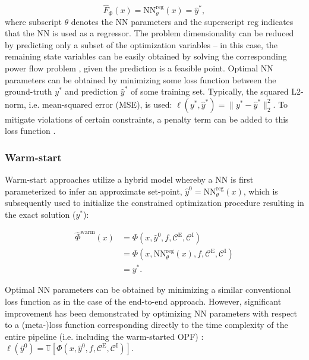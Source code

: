 \documentclass[journal]{IEEEtran}
\begin{document}
\begin{equation}
    \hat{F}_{\Phi}(x) = \mathrm{NN}_{\theta}^{\mathrm{reg}}(x) = \hat{y}^{*},
\end{equation}
where subscript $\theta$ denotes the NN parameters and the superscript $\mathrm{reg}$ indicates that the NN is used as a regressor. The problem dimensionality can be reduced by predicting only a subset of the optimization variables -- in this case, the remaining state variables can be easily obtained by solving the corresponding power flow problem \cite{Zamzam2019}, given the prediction is a feasible point. Optimal NN parameters can be obtained by minimizing some loss function between the ground-truth $y^*$ and prediction $\hat{y}^{*}$ of some training set. Typically, the squared L2-norm, i.e. mean-squared error (MSE), is used: $\ell(y^*,\hat{y}^*) = \| y^*-\hat{y}^* \|_2^2$. To mitigate violations of certain constraints, a penalty term can be added to this loss function \cite{Fioretto2019}.

\subsubsection{Warm-start}
Warm-start approaches utilize a hybrid model whereby a NN is first parameterized to infer an approximate set-point, $\hat{y}^{0} = \mathrm{NN}_{\theta}^{\mathrm{reg}}(x)$, which is subsequently used to initialize the constrained optimization procedure resulting in the exact solution ($y^{*}$): 

\begin{align}
    \hat{\Phi}^{\mathrm{warm}}(x) & = \Phi \left( x, \hat{y}^{0}, f, \mathcal{C}^{\mathrm{E}}, \mathcal{C}^{\mathrm{I}} \right) \\ & = \Phi \left( x, \mathrm{NN}_{\theta}^{\mathrm{reg}}(x), f, \mathcal{C}^{\mathrm{E}}, \mathcal{C}^{\mathrm{I}} \right) \\ & = y^{*}.
\end{align}

Optimal NN parameters can be obtained by minimizing a similar conventional loss function as in the case of the end-to-end approach. However, significant improvement has been demonstrated by optimizing NN parameters with respect to a (meta-)loss function corresponding directly to the time complexity of the entire pipeline (i.e. including the warm-started OPF) \cite{Jamei2019}: $\ell(\hat{y}^0) = \mathbb{T} \left[\Phi \left( x, \hat{y}^{0}, f, \mathcal{C}^{\mathrm{E}}, \mathcal{C}^{\mathrm{I}} \right)\right]$.
\end{document}
